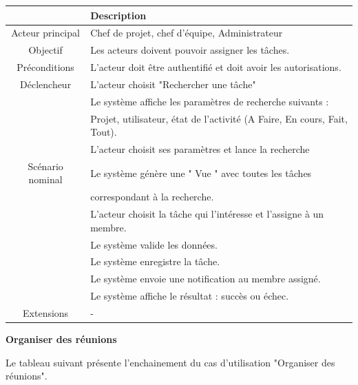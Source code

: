 \begin{center}
\begin{tabular}{|c|l|}
\hline 
&\textbf { Description }\\\hline 
    Acteur principal & Chef de projet, chef d’équipe, Administrateur \\\hline 
    Objectif&Les acteurs doivent pouvoir assigner les tâches.\\\hline
    Préconditions&L’acteur doit être authentifié et doit avoir les autorisations.  \\\hline 
    Déclencheur&L’acteur choisit "Rechercher une tâche"\\\hline 
    &Le système affiche les paramètres de recherche suivants :      \\
    &Projet, utilisateur, état de l’activité (A Faire, En cours, Fait, Tout).   \\
    &L’acteur choisit ses paramètres et lance la recherche  \\
    Scénario nominal&Le système génère une " Vue " avec toutes les tâches     \\
    & correspondant à la recherche.   \\&L’acteur choisit la tâche qui l’intéresse et l’assigne à un membre.\\
    &Le système valide les données. \\&Le système enregistre la tâche. \\&Le système envoie une notification au membre assigné.\\&Le système affiche le résultat : succès ou échec.  \\\hline
    Extensions&   -\\\hline
\end{tabular}
\label{desc_modif_tache}
\end{center}
\newpage
\par \textbf{  	 	Organiser des réunions	}
\par Le tableau suivant présente l’enchainement du cas d’utilisation "Organiser des réunions".
